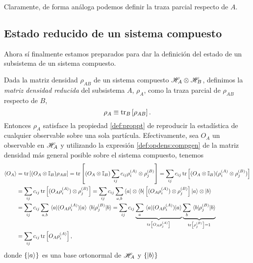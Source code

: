 \documentclass[10pt, a4paper]{article}
\numberwithin{equation}{subsection}
\begin{document}
\bigbreak

Claramente, de forma análoga podemos definir la traza parcial respecto de $A$.

\subsection{Estado reducido de un sistema compuesto}
Ahora sí finalmente estamos preparados para dar la definición del estado de un
subsistema de un sistema compuesto.

\bigbreak

Dada la matriz densidad $\rho_{AB}$ de un sistema compuesto $\mathscr{H}_A \otimes
\mathscr{H}_B$, definimos la \emph{matriz densidad reducida} del subsistema $A$,
$\rho_A$, como la traza parcial de $\rho_{AB}$ respecto de $B$,
\begin{equation} \label{def:redstate}
  \rho_{A} \equiv \tr_B\left[\rho_{AB}\right].
\end{equation}
Entonces $\rho_A$ satisface la propiedad \eqref{def:proppt} de reproducir la
estadística de cualquier observable sobre una sola partícula. Efectivamente,
sea $O_A$ un observable en $\mathscr{H}_A$ y utilizando la expresión
\eqref{def:opdens:compgen} de la matriz densidad más general posible sobre el
sistema compuesto, tenemos
\begin{align}
  \expval{O_A}
  &= \tr\left[(O_A\tensor\Id_B) \rho_{AB}\right]
  = \tr\left[(O_A\tensor\Id_B) \sum_{ij}c_{ij} \rho^{(A)}_{i} \tensor
    \rho^{(B)}_{j}\right]
  = \sum_{ij}c_{ij} \tr\left[(O_A\tensor\Id_B) (\rho^{(A)}_{i} \tensor
    \rho^{(B)}_{j})\right] \nonumber \\
  &= \sum_{ij}c_{ij} \tr\left[(O_A\rho^{(A)}_{i}) \tensor
    \rho^{(B)}_{j}\right]
  = \sum_{ij}c_{ij} \sum_{a,b} \bra{a}\tensor\bra{b}\left[(O_A\rho^{(A)}_{i})
    \tensor \rho^{(B)}_{j}\right] \ket{a}\tensor\ket{b} \nonumber \\
  &= \sum_{ij}c_{ij} \sum_{a,b} \matrixel{a}{(O_A\rho^{(A)}_{i})}{a}
      \matrixel{b}{\rho^{(B)}_{j}}{b}
  = \sum_{ij}c_{ij} \underbrace{\sum_{a}
      \matrixel{a}{(O_A\rho^{(A)}_{i})}{a}}_{\tr\left[O_A\rho^{(A)}_{j}\right]}
      \underbrace{\sum_{b}
      \matrixel{b}{\rho^{(B)}_{j}}{b}}_{\tr\left[\rho^{(B)}_{j}\right] = 1}
      \nonumber \\
  &= \sum_{ij}c_{ij} \tr\left[O_A\rho^{(A)}_{i}\right],
\end{align}
donde $\set{\ket{a}}$ es una base ortonormal de $\mathscr{H}_A$ y $\set{\ket{b}}$
\end{document}
